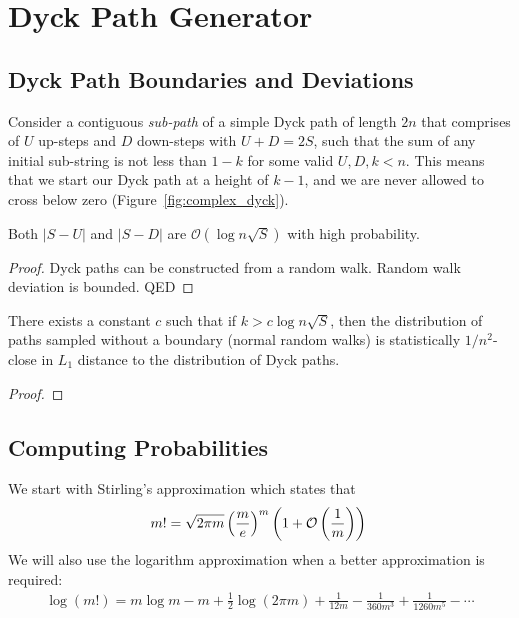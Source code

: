 \section{Dyck Path Generator}%
\label{sec:dyck_appendix}

\subsection{Dyck Path Boundaries and Deviations}%
\label{sub:dyck_path_boundaries_and_deviations}
Consider a contiguous \emph{sub-path} of a simple Dyck path of length $2n$ that comprises of $U$ up-steps and $D$ down-steps
with $U + D = 2S$, such that the sum of any initial sub-string is not less than $1-k$ for some valid $U, D, k < n$.
This means that we start our Dyck path at a height of $k-1$,
and we are never allowed to cross below zero (Figure~\ref{fig:complex_dyck}).

\begin{lemma}
\label{lem:dyck_path_deviation_bound}
Both $|S-U|$ and $|S-D|$ are $\mathcal O(\log n\sqrt S)$ with high probability.
\end{lemma}
\begin{proof}
Dyck paths can be constructed from a random walk. Random walk deviation is bounded. QED
\end{proof}
\begin{lemma}
\label{lem:dyck_path_irrelevant_boundary}
There exists a constant $c$ such that if $k > c\log n\sqrt S$, then the distribution of paths sampled without a boundary
(normal random walks) is statistically $1/n^2$-close in $L_1$ distance to the distribution of Dyck paths.
\end{lemma}
\begin{proof}

\end{proof}


\subsection{Computing Probabilities}%
\label{sub:computing_probabilities}
We start with Stirling's approximation which states that
\[
m! = \sqrt{2\pi m}\left( \frac me\right)^m\left( 1 + \mathcal O\left( \frac 1m\right)\right)\\
\]
We will also use the logarithm approximation when a better approximation is required:
\begin{align}
    \label{eq:log_factorial_approximation}
\log (m!) = m\log m -m + \frac 12 \log(2\pi m) + \frac{1}{12m} - \frac{1}{360m^3} + \frac{1}{1260m^5} - \cdots
\end{align}

